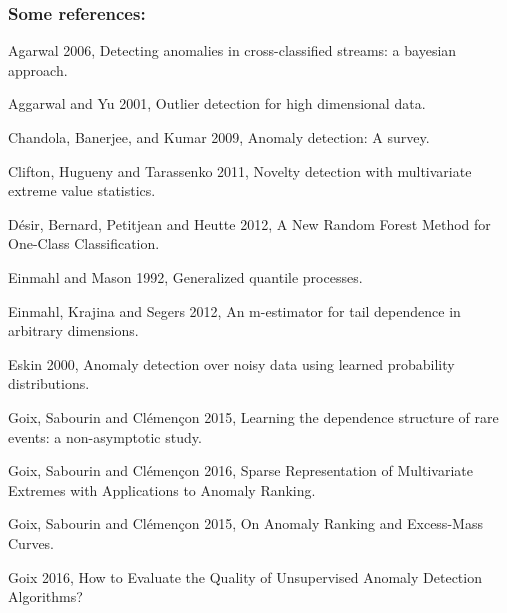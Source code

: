 \documentclass[9pt]{beamer}
\begin{document}
\begin{frame}
\frametitle{Some references:}
\begin{itemize}
\footnotesize{
\item Agarwal 2006, Detecting anomalies in cross-classified streams: a bayesian approach.

\item Aggarwal and Yu 2001, Outlier detection for high dimensional data.


\item Chandola, Banerjee, and Kumar 2009, Anomaly detection: A survey.


\item Clifton, Hugueny and Tarassenko 2011, Novelty detection with multivariate extreme value statistics.

\item Désir, Bernard, Petitjean and Heutte 2012, A New Random Forest Method for One-Class Classification.

\item Einmahl and Mason 1992, Generalized quantile processes.


\item Einmahl, Krajina and Segers 2012, An m-estimator for tail dependence in arbitrary dimensions.

\item Eskin 2000,  Anomaly detection over noisy data using learned probability distributions.

\item Goix, Sabourin and Clémençon 2015, Learning the dependence structure of rare events: a non-asymptotic study.

\item Goix, Sabourin and Clémençon 2016, Sparse Representation of Multivariate Extremes with Applications to Anomaly Ranking.

\item Goix, Sabourin and Clémençon 2015, On Anomaly Ranking and Excess-Mass Curves.

\item Goix 2016, How to Evaluate the Quality of Unsupervised Anomaly Detection Algorithms?

}
\end{itemize}
\end{frame}
\end{document}
